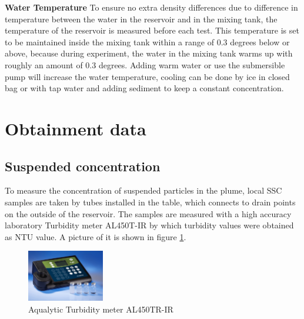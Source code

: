 \noindent \textbf{Water Temperature} \newline
To ensure no extra density differences due to difference in temperature between the water in the reservoir and in the mixing tank, the temperature of the reservoir is measured before each test. This temperature is set to be maintained inside the mixing tank within a range of 0.3 degrees below or above, because during experiment, the water in the mixing tank warms up with roughly an amount of 0.3 degrees. Adding warm water or use the submersible pump will increase the water temperature, cooling can be done by ice in closed bag or with tap water and adding sediment to keep a constant concentration.




\newpage
\section{Obtainment data}
\subsection{Suspended concentration}

To measure the concentration of suspended particles in the plume, local SSC samples are taken by tubes installed in the table, which connects to drain points on the outside of the reservoir. The samples are measured with a high accuracy laboratory Turbidity meter AL450T-IR by which turbidity values were obtained as NTU value. A picture of it is shown in figure \ref{fig:turbiditymeter}.

\begin{figure}[ht!]
    \centering
    \includegraphics[width=0.3\textwidth]{Images/al450_tir.jpg}
    \caption{Aqualytic Turbidity meter AL450TR-IR}
    \label{fig:turbiditymeter}
\end{figure}


